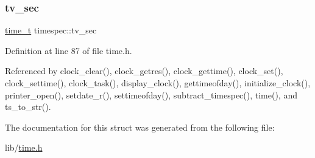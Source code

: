 \mbox{\label{structtimespec_afc3302668d7cb5952f590da69fdd4955}} 
\subsubsection{\texorpdfstring{tv\+\_\+sec}{tv\_sec}}
{\footnotesize\ttfamily \hyperlink{time_8h_a3346b04b0420b32ccf6b706551b70762}{time\+\_\+t} timespec\+::tv\+\_\+sec}



Definition at line 87 of file time.\+h.



Referenced by clock\+\_\+clear(), clock\+\_\+getres(), clock\+\_\+gettime(), clock\+\_\+set(), clock\+\_\+settime(), clock\+\_\+task(), display\+\_\+clock(), gettimeofday(), initialize\+\_\+clock(), printer\+\_\+open(), setdate\+\_\+r(), settimeofday(), subtract\+\_\+timespec(), time(), and ts\+\_\+to\+\_\+str().



The documentation for this struct was generated from the following file\+:\begin{DoxyCompactItemize}
\item 
lib/\hyperlink{time_8h}{time.\+h}\end{DoxyCompactItemize}
